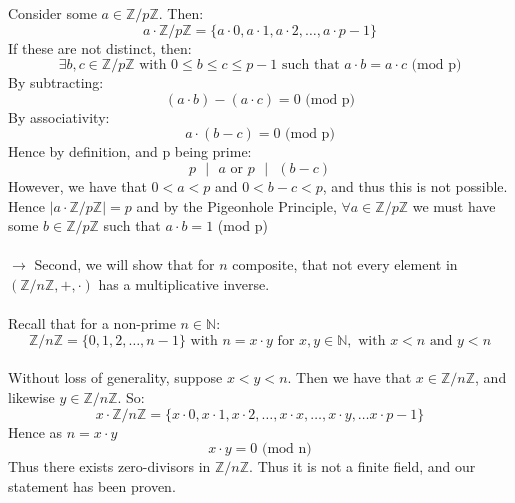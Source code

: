 \documentclass[11pt]{article}
\theoremstyle{plain}
\theoremstyle{definition}
\begin{document}
Consider some $a \in \mathbb{Z}/p\mathbb{Z}$. Then:
\begin{equation*}
a \cdot \mathbb{Z}/p\mathbb{Z} = \{ a\cdot 0, a\cdot 1, a\cdot2, \ldots, a\cdot p-1\}
\end{equation*}
If these are not distinct, then:
\begin{equation*}
\exists b,c \in \mathbb{Z}/p\mathbb{Z}\text{ with } 0\leq b\leq c \leq p-1 \text{ such that } a\cdot b = a\cdot c\text{ (mod p)}
\end{equation*}
By subtracting:
\begin{equation*}
(a\cdot b) - (a\cdot c) = 0\text{ (mod p)}
\end{equation*}
By associativity:
\begin{equation*}
a\cdot (b - c) = 0\text{ (mod p)}
\end{equation*}
Hence by definition, and p being prime:
\begin{equation*}
p\text{ }|\text{ } a\text{ or } p\text{ }|\text{ } (b-c)
\end{equation*}
However, we have that $0 < a < p$ and $0 < b-c < p$, and thus this is not possible. Hence $| a \cdot \mathbb{Z}/p\mathbb{Z}| = p$ and by the Pigeonhole Principle, $\forall a \in \mathbb{Z}/p\mathbb{Z}$  we must have some $b \in \mathbb{Z}/p\mathbb{Z}$ such that $a \cdot b = 1$ (mod p)\\
\\
$\rightarrow$ Second, we will show that for $n$ composite, that not every element in $(\mathbb{Z}/n\mathbb{Z}, +, \cdot)$ has a multiplicative inverse.\\
\\
Recall that for a non-prime $n \in \mathbb{N}$:
\begin{equation*}
\mathbb{Z}/n\mathbb{Z} = \{0,1,2, \ldots, n-1 \} \text{ with }n = x \cdot y \text{ for }x,y \in \mathbb{N}, \text{ with } x < n \text{ and } y < n
\end{equation*}
\\
Without loss of generality, suppose $x < y < n$. Then we have that $x \in \mathbb{Z}/n\mathbb{Z}$, and likewise $y \in \mathbb{Z}/n\mathbb{Z}$. So:
\begin{equation*}
x \cdot \mathbb{Z}/n\mathbb{Z} = \{ x\cdot 0, x\cdot 1, x\cdot2, \ldots, x\cdot x, \dots, x\cdot y, \ldots x\cdot p-1\}
\end{equation*}
Hence as $n = x \cdot y$
\begin{equation*}
x\cdot y = 0 \text{ (mod n)}
\end{equation*}
Thus there exists zero-divisors in $\mathbb{Z}/n\mathbb{Z}$. Thus it is not a finite field, and our statement has been proven.\\
\end{document}

